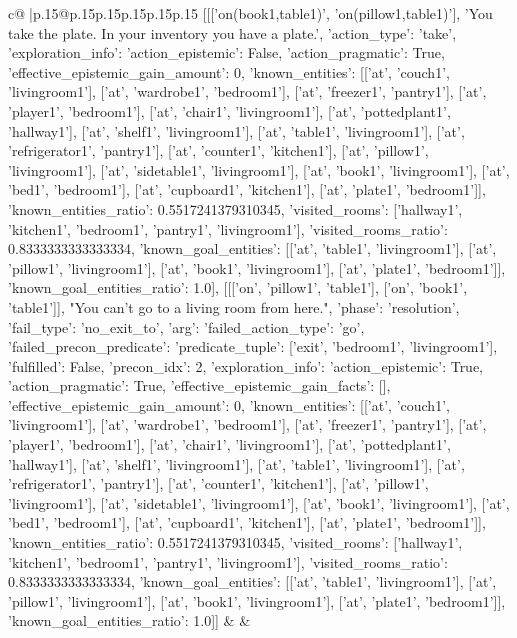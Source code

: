\documentclass{article}
\begin{document}
{\begin{supertabular}{c@{$\;$}|p{.15\linewidth}@{}p{.15\linewidth}p{.15\linewidth}p{.15\linewidth}p{.15\linewidth}p{.15\linewidth}}
{{{	 [[['on(book1,table1)', 'on(pillow1,table1)'], 'You take the plate. In your inventory you have a plate.', {'action_type': 'take', 'exploration_info': {'action_epistemic': False, 'action_pragmatic': True, 'effective_epistemic_gain_amount': 0, 'known_entities': [['at', 'couch1', 'livingroom1'], ['at', 'wardrobe1', 'bedroom1'], ['at', 'freezer1', 'pantry1'], ['at', 'player1', 'bedroom1'], ['at', 'chair1', 'livingroom1'], ['at', 'pottedplant1', 'hallway1'], ['at', 'shelf1', 'livingroom1'], ['at', 'table1', 'livingroom1'], ['at', 'refrigerator1', 'pantry1'], ['at', 'counter1', 'kitchen1'], ['at', 'pillow1', 'livingroom1'], ['at', 'sidetable1', 'livingroom1'], ['at', 'book1', 'livingroom1'], ['at', 'bed1', 'bedroom1'], ['at', 'cupboard1', 'kitchen1'], ['at', 'plate1', 'bedroom1']], 'known_entities_ratio': 0.5517241379310345, 'visited_rooms': ['hallway1', 'kitchen1', 'bedroom1', 'pantry1', 'livingroom1'], 'visited_rooms_ratio': 0.8333333333333334, 'known_goal_entities': [['at', 'table1', 'livingroom1'], ['at', 'pillow1', 'livingroom1'], ['at', 'book1', 'livingroom1'], ['at', 'plate1', 'bedroom1']], 'known_goal_entities_ratio': 1.0}}], [[['on', 'pillow1', 'table1'], ['on', 'book1', 'table1']], "You can't go to a living room from here.", {'phase': 'resolution', 'fail_type': 'no_exit_to', 'arg': {'failed_action_type': 'go', 'failed_precon_predicate': {'predicate_tuple': ['exit', 'bedroom1', 'livingroom1'], 'fulfilled': False, 'precon_idx': 2}}, 'exploration_info': {'action_epistemic': True, 'action_pragmatic': True, 'effective_epistemic_gain_facts': [], 'effective_epistemic_gain_amount': 0, 'known_entities': [['at', 'couch1', 'livingroom1'], ['at', 'wardrobe1', 'bedroom1'], ['at', 'freezer1', 'pantry1'], ['at', 'player1', 'bedroom1'], ['at', 'chair1', 'livingroom1'], ['at', 'pottedplant1', 'hallway1'], ['at', 'shelf1', 'livingroom1'], ['at', 'table1', 'livingroom1'], ['at', 'refrigerator1', 'pantry1'], ['at', 'counter1', 'kitchen1'], ['at', 'pillow1', 'livingroom1'], ['at', 'sidetable1', 'livingroom1'], ['at', 'book1', 'livingroom1'], ['at', 'bed1', 'bedroom1'], ['at', 'cupboard1', 'kitchen1'], ['at', 'plate1', 'bedroom1']], 'known_entities_ratio': 0.5517241379310345, 'visited_rooms': ['hallway1', 'kitchen1', 'bedroom1', 'pantry1', 'livingroom1'], 'visited_rooms_ratio': 0.8333333333333334, 'known_goal_entities': [['at', 'table1', 'livingroom1'], ['at', 'pillow1', 'livingroom1'], ['at', 'book1', 'livingroom1'], ['at', 'plate1', 'bedroom1']], 'known_goal_entities_ratio': 1.0}}]] 
	  } 
	   } 
	   } 
	 & & \\ 
 


\end{supertabular}}
\end{document}

